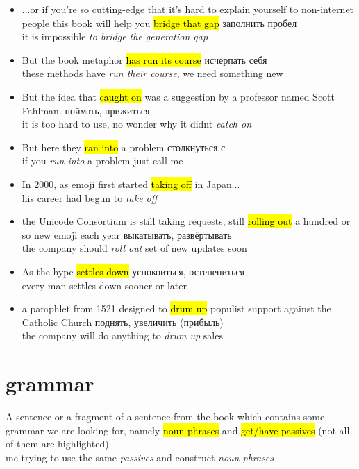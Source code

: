 \documentclass[
]{article}
\providecommand{\tightlist}{%
  \setlength{\itemsep}{0pt}\setlength{\parskip}{0pt}}
\begin{document}
\begin{itemize}
\tightlist
\item
  ...or if you're so cutting-edge that it's hard to explain yourself to
  non-internet people this book will help you \hl{bridge that gap}
  \textbar\textbar{} заполнить пробел\\
  it is impossible \emph{to bridge the generation gap}
\item
  But the book metaphor \hl{has run its course}
  \textbar\textbar исчерпать себя\\
  these methods have \emph{run their course}, we need something new
\item
  But the idea that \hl{caught on} was a suggestion by a professor named
  Scott Fahlman. \textbar\textbar{} поймать, прижиться\\
  it is too hard to use, no wonder why it didn\textquotesingle t
  \emph{catch on}
\item
  But here they \hl{ran into} a problem \textbar\textbar{} столкнуться
  с\\
  if you \emph{run into} a problem just call me
\item
  In 2000, as emoji first started \hl{taking off} in Japan...\\
  his career had begun to \emph{take off}
\item
  the Unicode Consortium is still taking requests, still \hl{rolling
  out} a hundred or so new emoji each year \textbar\textbar{}
  выкатывать, развёртывать\\
  the company should \emph{roll out} set of new updates soon
\item
  As the hype \hl{settles down} \textbar\textbar{} успокоиться,
  остепениться\\
  every man settles down sooner or later
\item
  a pamphlet from 1521 designed to \hl{drum up} populist support against
  the Catholic Church \textbar\textbar{} поднять, увеличить (прибыль)\\
  the company will do anything to \emph{drum up} sales
\end{itemize}

\section{grammar}\label{grammar}

A sentence or a fragment of a sentence from the book which contains some
grammar we are looking for, namely \hl{noun phrases} and \hl{get/have
passives} (not all of them are highlighted)\\
me trying to use the same \emph{passives} and construct \emph{noun
phrases}
\end{document}
